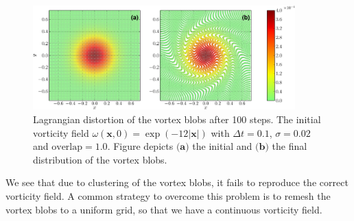 
	\begin{figure}[t]
	\centering
	\includegraphics[width=0.9\textwidth]{figures/lagrangian/distortion-crop.pdf}
    \caption{Lagrangian distortion of the vortex blobs after 100 steps. The initial vorticity field $\omega\left(\mathbf{x},0\right) = \exp\left(-12\left|\mathbf{x}\right|\right)$ with $\Delta t = 0.1$, $\sigma=0.02$ and $\mathrm{overlap} = 1.0$. Figure depicts $\textbf{(a)}$ the initial and $\textbf{(b)}$ the final distribution of the vortex blobs.}
    \label{fig:distortion}
	\end{figure}


We see that due to clustering of the vortex blobs, it fails to reproduce the correct vorticity field. A common strategy to overcome this problem is to remesh the vortex blobs to a uniform grid, so that we have a continuous vorticity field.

